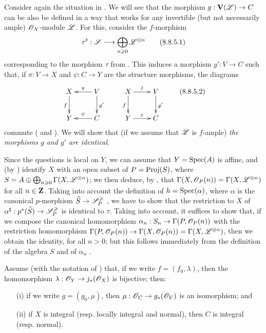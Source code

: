 \begin{env}[8.8.5]
Consider again the situation in .
We will see that the morphism $g:\bb{V}(\sh{L})\to C$ can be also be defined in a way that works for any invertible (but not necessarily ample) $\mathscr{O}_X$-module $\mathscr{L}$.
For this, consider the $f$-morphism
\[
\label{II.8.8.5.1}
  \tau^\flat:\sh{S}\to\bigoplus_{n\geq0}\sh{L}^{\otimes n}
  \tag{8.8.5.1}
\]
corresponding to the morphism $\tau$ from .
This induces  a morphism $g':V\to C$ such that, if $\pi:V\to X$ and $\psi:C\to Y$ are the structure morphisms, the diagrams
\[
\label{II.8.8.5.2}
  \xymatrix{
    X
      \ar[d]_{f}
  & V
      \ar[l]_{\pi}
      \ar[d]^{g'}
  \\Y
  & C
      \ar[l]_{\psi}
  }
  \qquad
  \xymatrix{
    X
      \ar[r]^{j}
      \ar[d]_{f}
  & V
      \ar[d]^{g'}
  \\Y
      \ar[r]^{\varepsilon}
  & C
  }
\tag{8.8.5.2}
\]
commute ( and ).
We will show that (if we assume that $\mathscr{L}$ is $f$-ample) \emph{the morphisms $g$ and $g'$ are identical}.

Since the questions is local on $Y$, we can assume that $Y=\operatorname{Spec}(A)$ is affine, and (by ) identify $X$ with an open subset of $P=\operatorname{Proj}(S)$, where $S=A\oplus\bigoplus_{n\geqslant0}\Gamma(X,\mathscr{L}^{\otimes n})$;
we then deduce, by , that $\Gamma(X,\mathscr{O}_P(n))=\Gamma(X,\mathscr{L}^{\otimes n})$ for all $n\in\mathbf{Z}$.
Taking into account the definition of $h=\operatorname{Spec}(\alpha)$, where $\alpha$ is the canonical $p$-morphism $\widetilde{S}\to\sh{S}_P^\geq$ , we have to show that the restriction to $X$ of $\alpha^\sharp:p^*(\widetilde{S})\to\sh{S}_P^\geq$ is identical to $\tau$.
Taking  into account, it suffices to show that, if we compose the canonical homomorphism $\alpha_n:S_n\to\Gamma(P,\sh{O}_P(n))$ with the restriction homomorphism $\Gamma(P,\sh{O}_P(n))\to\Gamma(X,\sh{O}_P(n))=\Gamma(X,\sh{L}^{\otimes n})$, then we obtain the identity, for all $n>0$;
but this follows immediately from the definition of the algebra $S$ and of $\alpha_n$ .
\end{env}

\begin{proposition}[8.8.6]
\label{II.8.8.6}
Assume (with the notation of ) that, if we write $f=(f_0,\lambda)$, then the homomorphism $\lambda:\sh{O}_Y\to j_*(\sh{O}_X)$ is bijective;
then:
\begin{enumerate}
  \item[\rm{(i)}] if we write $g=(g_0,\mu)$, then $\mu:\sh{O}_C\to g_*(\sh{O}_V)$ is an isomorphism; and
  \item[\rm{(ii)}] if $X$ is integral (resp. locally integral and normal), then $C$ is integral (resp. normal).
\end{enumerate}
\end{proposition}

